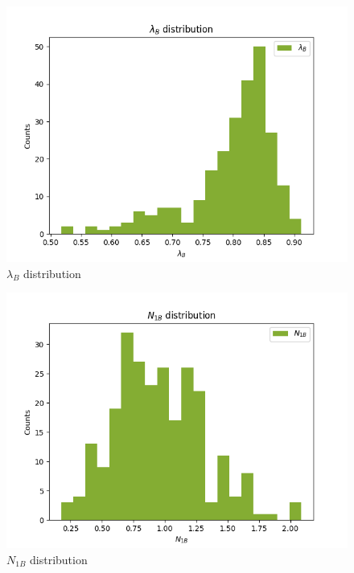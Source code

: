 \documentclass[
]{article}
\begin{document}
\begin{figure}
\centering
\includegraphics{pngplots/param5.png}
\caption{\(\lambda_B\) distribution}
\end{figure}

\begin{figure}
\centering
\includegraphics{pngplots/param6.png}
\caption{\(N_{1B}\) distribution}
\end{figure}
\end{document}
